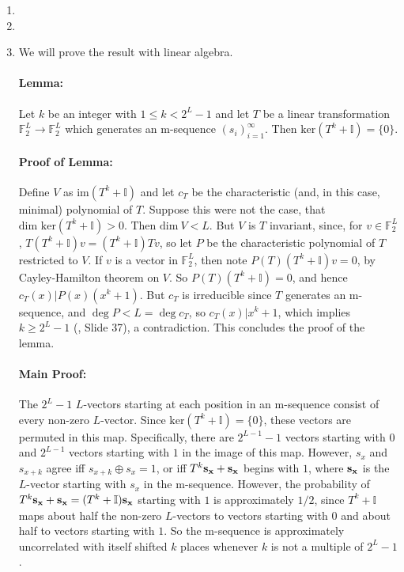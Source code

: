 \begin{enumerate}
\item
\item
\item We will prove the result with linear algebra.

\paragraph{Lemma:} Let $k$ be an integer with $1 \le k < 2^L-1$ and let $T$
be a linear transformation $\mathbb{F}^L_2 \to \mathbb{F}^L_2$ which
generates an m-sequence $(s_i)_{i=1}^\infty$. Then $\text{ker}(T^k+\mathbb{I})=\{0\}$.

\paragraph{Proof of Lemma:} Define $V$ as $\text{im}(T^k+\mathbb{I})$ and let
$c_T$ be the characteristic (and, in this case, minimal) polynomial of $T$.
Suppose this were not the case, that
$\text{dim ker}(T^k+\mathbb{I})>0$. Then $\text{dim}\ V<L$.
But $V$ is $T$ invariant, since, for $v \in \mathbb{F}_2^L$,
$T(T^k+\mathbb{I})v=(T^k+\mathbb{I})Tv$,
so let $P$ be the characteristic polynomial of $T$ restricted to $V$.
If $v$ is a vector in $\mathbb{F}^L_2$, then note $P(T)(T^k+\mathbb{I})v=0$,
by Cayley-Hamilton theorem on $V$. So $P(T)(T^k+\mathbb{I})=0$, and hence
$c_T(x) | P(x)(x^k+1)$. But $c_T$ is irreducible since $T$ generates an
m-sequence, and $\deg P<L=\deg c_T$, so $c_T(x) | x^k+1$, which implies
$k\ge 2^L-1$ (\cite{slides}, Slide 37), a contradiction. This concludes
the proof of the lemma.

\paragraph{Main Proof:} The $2^L-1$ $L$-vectors starting at each position
in an m-sequence consist of every non-zero $L$-vector. Since 
$\text{ker}(T^k+\mathbb{I})=\{0\}$, these vectors are permuted in this map.
Specifically, there are $2^{L-1}-1$ vectors starting with $0$ and $2^{L-1}$ vectors
starting with $1$ in the image of this map. However, $s_x$ and $s_{x+k}$
agree iff $s_{x+k}\oplus s_x=1$, or iff $T^k{\bf s_x}+{\bf s_x}$ begins with
$1$, where ${\bf s_x}$ is the $L$-vector starting with $s_x$ in the m-sequence.
However, the probability of $T^k{\bf s_x}+{\bf s_x}=(T^k+\mathbb{I}){\bf s_x}$
starting with $1$ is approximately $1/2$, since $T^k+\mathbb{I}$ maps about half the non-zero
$L$-vectors to vectors starting with $0$ and about half to vectors starting with
$1$. So the m-sequence
is approximately uncorrelated with itself shifted $k$ places whenever $k$ is not
a multiple of $2^L-1$.
\end{enumerate}
